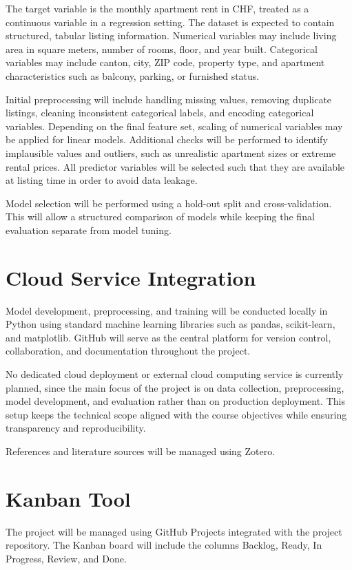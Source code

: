\documentclass[11pt,a4paper]{article}
\begin{document}
The target variable is the monthly apartment rent in CHF, treated as a continuous variable in a regression setting. The dataset is expected to contain structured, tabular listing information. Numerical variables may include living area in square meters, number of rooms, floor, and year built. Categorical variables may include canton, city, ZIP code, property type, and apartment characteristics such as balcony, parking, or furnished status.

Initial preprocessing will include handling missing values, removing duplicate listings, cleaning inconsistent categorical labels, and encoding categorical variables. Depending on the final feature set, scaling of numerical variables may be applied for linear models. Additional checks will be performed to identify implausible values and outliers, such as unrealistic apartment sizes or extreme rental prices. All predictor variables will be selected such that they are available at listing time in order to avoid data leakage.

Model selection will be performed using a hold-out split and cross-validation. This will allow a structured comparison of models while keeping the final evaluation separate from model tuning.


\section{Cloud Service Integration}

Model development, preprocessing, and training will be conducted locally in Python using standard machine learning libraries such as pandas, scikit-learn, and matplotlib. GitHub will serve as the central platform for version control, collaboration, and documentation throughout the project.

No dedicated cloud deployment or external cloud computing service is currently planned, since the main focus of the project is on data collection, preprocessing, model development, and evaluation rather than on production deployment. This setup keeps the technical scope aligned with the course objectives while ensuring transparency and reproducibility.

References and literature sources will be managed using Zotero.


\section{Kanban Tool}

The project will be managed using GitHub Projects integrated with the project repository. The Kanban board will include the columns Backlog, Ready, In Progress, Review, and Done.
\end{document}
